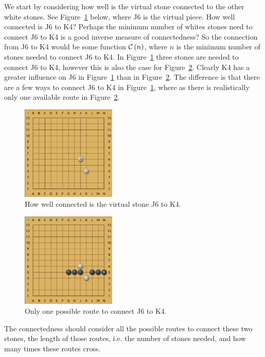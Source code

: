 \documentclass[doublespacing, 12pt, a4paper]{article}
\begin{document}
We start by considering how well is the virtual stone connected to the other white stones. See Figure~\ref{fig:VirtualWhitePiece} below, where J6 is the virtual piece. How well connected is J6 to K4?
Perhaps the minimum number of whites stones need to connect J6 to K4 is a good inverse measure of connectedness? So the connection from J6 to K4 would be some function $\mathcal C \left(n\right)$, where $n$ is the minimum number of stones needed to connect J6 to K4. In Figure~\ref{fig:VirtualWhitePiece} three stones are needed to connect J6 to K4, however this is also the case for Figure~\ref{fig:OneRoute}. Clearly K4 has a greater influence on J6 in Figure~\ref{fig:VirtualWhitePiece} than in Figure~\ref{fig:OneRoute}. The difference is that there are a few ways to connect J6 to K4 in Figure~\ref{fig:VirtualWhitePiece}, where as there is realistically only one available route in Figure~\ref{fig:OneRoute}.
\begin{figure}
\centering
\includegraphics[width=0.4\textwidth]{VirtualWhite}
\caption{How well connected is the virtual stone J6 to K4.}
\label{fig:VirtualWhitePiece}
\end{figure}
\begin{figure}
  \centering
\includegraphics[width=0.4\textwidth]{OneRoute}
\caption{Only one possible route to connect J6 to K4.}
\label{fig:OneRoute}
\end{figure}

The connectedness should consider all the possible routes to connect these two stones, the length of those routes, i.e. the number of stones needed, and how many times these routes cross.
\end{document}
